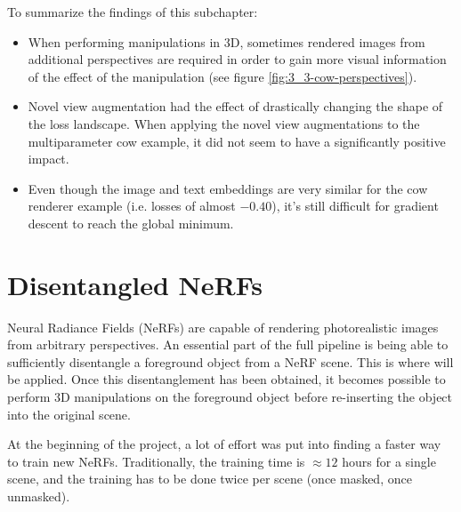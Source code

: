 To summarize the findings of this subchapter:
\begin{itemize}[noitemsep]
    \item When performing manipulations in 3D, sometimes rendered images from additional perspectives are required in order to gain more visual information of the effect of the manipulation (see figure \ref{fig:3_3-cow-perspectives}).
    
    \item Novel view augmentation had the effect of drastically changing the shape of the loss landscape. When applying the novel view augmentations to the multiparameter cow example, it did not seem to have a significantly positive impact.
    
    \item Even though the image and text embeddings are very similar for the cow renderer example (i.e. losses of almost $-0.40$), it's still difficult for gradient descent to reach the global minimum.
\end{itemize}


\section{Disentangled NeRFs}
Neural Radiance Fields (NeRFs) are capable of rendering photorealistic images from arbitrary perspectives. An essential part of the full pipeline is being able to sufficiently disentangle a foreground object from a NeRF scene. This is where \cite{benaim2022} will be applied. Once this disentanglement has been obtained, it becomes possible to perform 3D manipulations on the foreground object before re-inserting the object into the original scene.

At the beginning of the project, a lot of effort was put into finding a faster way to train new NeRFs. Traditionally, the training time is $\approx 12$ hours for a single scene, and the training has to be done twice per scene (once masked, once unmasked).

